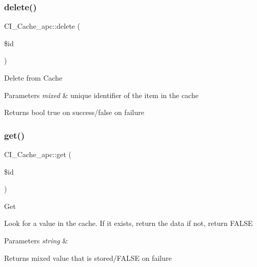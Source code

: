 \subsubsection{\texorpdfstring{delete()}{delete()}}
{\footnotesize\ttfamily C\+I\+\_\+\+Cache\+\_\+apc\+::delete (\begin{DoxyParamCaption}\item[{}]{\$id }\end{DoxyParamCaption})}

Delete from Cache


\begin{DoxyParams}{Parameters}
{\em mixed} & unique identifier of the item in the cache \\
\hline
\end{DoxyParams}
\begin{DoxyReturn}{Returns}
bool true on success/false on failure 
\end{DoxyReturn}
\mbox{\label{class_c_i___cache__apc_aa87b38f038c3b500f0902b7aade4e104}} 
\subsubsection{\texorpdfstring{get()}{get()}}
{\footnotesize\ttfamily C\+I\+\_\+\+Cache\+\_\+apc\+::get (\begin{DoxyParamCaption}\item[{}]{\$id }\end{DoxyParamCaption})}

Get

Look for a value in the cache. If it exists, return the data if not, return F\+A\+L\+SE


\begin{DoxyParams}{Parameters}
{\em string} & \\
\hline
\end{DoxyParams}
\begin{DoxyReturn}{Returns}
mixed value that is stored/\+F\+A\+L\+SE on failure 
\end{DoxyReturn}
\mbox{\label{class_c_i___cache__apc_a84dd11b9fc0bdebedadc36679eef5976}} 
